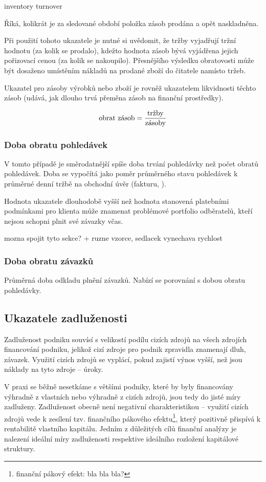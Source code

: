 inventory turnover

Říká, kolikrát je za sledované období položka zásob prodána a opět naskladněna.

Při použití tohoto ukazatele je nutné si uvědomit, že tržby vyjadřují tržní hodnotu (za kolik se prodalo), kdežto hodnota zásob bývá vyjádřena jejich pořizovací cenou (za kolik se nakoupilo). Přesnějšího výsledku obratovosti může být dosaženo umístěním nákladů na prodané zboží do čitatele namísto tržeb.

Ukazatel pro zásoby výrobků nebo zboží je rovněž ukazatelem likvidnosti těchto zásob (udává, jak dlouho trvá přeměna zásob na finanční prostředky).

$$\text{obrat zásob} = \dfrac{\text{tržby}}{\text{zásoby}}$$


\subsubsection{Doba obratu pohledávek}
V tomto případě je směrodatnější spíše doba trvání pohledávky než počet obratů pohledávek. Doba se vypočítá jako poměr průměrného stavu pohledávek k průměrné denní tržbě na obchodní úvěr (fakturu, ).

Hodnota ukazatele dlouhodobě vyšší než hodnota stanovená platebními podmínkami pro klienta může znamenat problémové portfolio odběratelů, kteří nejsou schopni plnit své závazky včas.

mozna spojit tyto sekce? + ruzne vzorce, sedlacek vynechava rychlost

\subsubsection{Doba obratu závazků}
Průměrná doba odkladu plnění závazků. Nabízí se porovnání s dobou obratu pohledávky. 





\subsection{Ukazatele zadluženosti}

Zadluženost podniku souvísí s velikostí podílu cizích zdrojů na všech zdrojích financování podniku, jelikož cizí zdroje pro podnik zpravidla znamenají dluh, závazek. Využití cizích zdrojů se vyplácí, pokud zajistí výnos vyšší, než jsou náklady na tyto zdroje -- úroky. 

V praxi se běžně nesetkáme s většími podniky, které by byly financovány výhradně z vlastních nebo výhradně z cizích zdrojů, jsou tedy do jisté míry zadluženy. Zadluženost obecně není negativní charakteristikou -- využití cizích zdrojů vede k zesílení tzv. finančního pákového efektu\footnote{finanční pákový efekt: bla bla bla?}, který pozitivně přispívá k rentabilitě vlastního kapitálu\cite{kisling}. Jedním z důležitých cílů finanční analýzy je nalezení ideální míry zadluženosti respektive ideálního rozložení kapitálové struktury.

